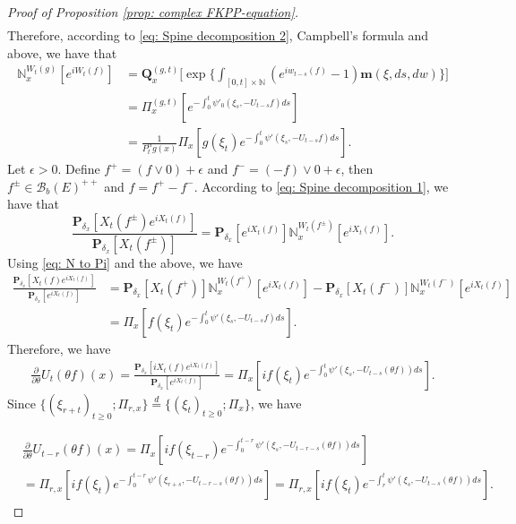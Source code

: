 \documentclass[12pt,a4paper]{amsart}
\theoremstyle{plain}
\theoremstyle{definition}
\numberwithin{equation}{section}
\begin{document}
\begin{proof}[Proof of Proposition \ref{prop: complex FKPP-equation}]
\begin{equation}
\begin{split}
\end{split}\end{equation}
    Therefore, according to \eqref{eq: Spine decomposition 2}, Campbell's formula and above, we have that
\begin{equation}\begin{split}
\label{eq: N to Pi}
    \mathbb N_x^{W_t(g)}[e^{i W_t(f)}]
    &=\mathbf Q_x^{(g,t)} \Big[\exp\Big\{\int_{[0,t]\times \mathbb N}(e^{i w_{t-s}(f)} - 1) \mathbf m(\xi, ds,dw)\Big\}\Big]
    \\&= \Pi_x^{(g,t)} [e^{-\int_0^t \psi'_0(\xi_s, -U_{t-s}f)ds}]
    \\&= \frac{1}{P_t^\alpha g (x)} \Pi_x[ g(\xi_t) e^{-\int_0^t \psi'(\xi_s, -U_{t-s}f)ds} ].
\end{split}\end{equation}
    Let $\epsilon >0$.
    Define $f^+ = (f \vee 0) + \epsilon$ and $f^- = (-f) \vee 0 + \epsilon$, then $f^\pm \in \mathcal B_b(E)^{++}$ and $f = f^+ - f^-$.
    According to \eqref{eq: Spine decomposition 1}, we have that
\begin{equation}
    \frac{\mathbf P_{\delta_x}[X_t(f^{\pm})e^{i X_t(f)}]}{\mathbf P_{\delta_x}[X_t(f^{\pm})]}
    = \mathbf P_{\delta_x}[e^{i X_t(f)}] \mathbb N_x^{W_t(f^{\pm})}[e^{i X_t(f)}].
\end{equation}
    Using \eqref{eq: N to Pi} and the above, we have
\begin{equation}\begin{split}
    \frac{\mathbf P_{\delta_x}[X_t(f)e^{i X_t(f)}] }{\mathbf P_{\delta_x}[e^{i X_t(f)}]}
    &= \mathbf P_{\delta_x}[X_t(f^+)] \mathbb N_x^{W_t(f^+)} [e^{i X_t(f)}] - \mathbf P_{\delta_x}[X_t(f^-)]\mathbb N_x^{W_t(f^-)}[e^{i X_t(f)}]
    \\& = \Pi_x[ f(\xi_t) e^{- \int_0^t \psi'(\xi_s, -U_{t-s}f) ds}  ].
\end{split}\end{equation}
    Therefore, we have
\begin{equation}\begin{split}
    \frac{\partial}{\partial \theta} {U_t(\theta f)(x)}
    = \frac{\mathbf P_{\delta_x}[iX_t(f)e^{i X_t(f)}] }{\mathbf P_{\delta_x}[e^{i X_t(f)}]}
    =  \Pi_x[ if(\xi_t) e^{ - \int_0^t \psi'(\xi_s, -U_{t-s}(\theta f)) ds} ].
\end{split}\end{equation}
    Since $\{(\xi_{r+t})_{t \geq 0}; \Pi_{r,x}\} \overset{d}{=} \{(\xi_{t})_{t\geq 0}; \Pi_{x}\} $, we have

\begin{equation}\begin{split}
    &\frac{\partial}{\partial \theta} U_{t-r}(\theta f)( x)
    = \Pi_x[ i f(\xi_{t-r}) e^{-\int_0^{t-r} \psi'(\xi_s, -U_{t-r-s}(\theta f)) ds} ]
    \\&= \Pi_{r,x}[i f(\xi_t)e^{-\int_0^{t-r} \psi'(\xi_{r+s}, -U_{t-r-s}(\theta f)) ds} ]
    = \Pi_{r,x}[if(\xi_t)e^{-\int_r^t \psi'(\xi_{s}, -U_{t-s}(\theta f)) ds} ].
\end{split}\end{equation}


\end{proof}
\end{document}
